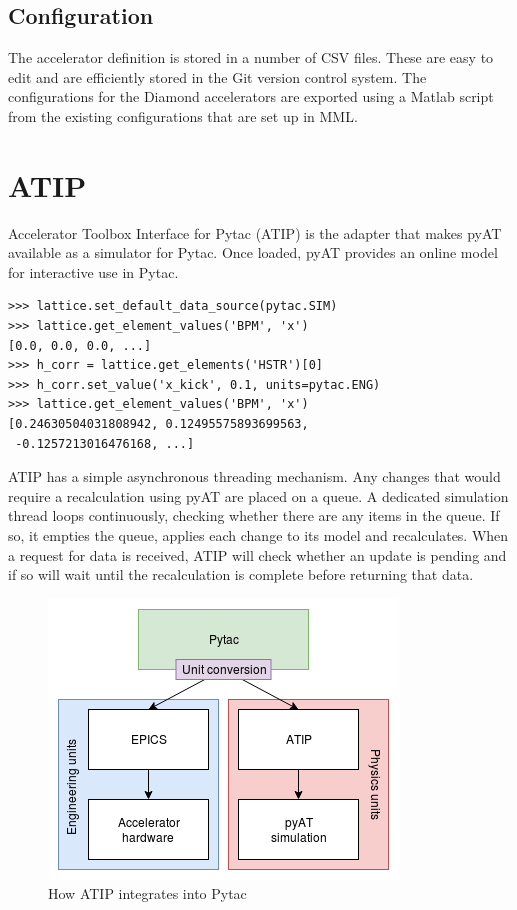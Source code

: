 \documentclass[a4paper,
               keeplastbox,   %
               ]{jacow}
\begin{document}
\subsection{Configuration}

The accelerator definition is stored in a number of CSV files. These are easy
to edit and are efficiently stored in the Git version control system. The
configurations for the Diamond accelerators are exported using a Matlab script
from the existing configurations that are set up in MML.

\section{ATIP}

Accelerator Toolbox Interface for Pytac (ATIP) is the adapter that makes pyAT
available as a simulator for Pytac. Once loaded, pyAT provides an online model
for interactive use in Pytac.

\begin{lstlisting}
>>> lattice.set_default_data_source(pytac.SIM)
>>> lattice.get_element_values('BPM', 'x')
[0.0, 0.0, 0.0, ...]
>>> h_corr = lattice.get_elements('HSTR')[0]
>>> h_corr.set_value('x_kick', 0.1, units=pytac.ENG)
>>> lattice.get_element_values('BPM', 'x')
[0.24630504031808942, 0.12495575893699563, 
 -0.1257213016476168, ...]
\end{lstlisting}

ATIP has a simple asynchronous threading mechanism. Any changes that would require a
recalculation using pyAT are placed on a queue. A dedicated simulation thread loops
continuously, checking whether there are any items in the queue. If so, it empties the
queue, applies each change to its model and recalculates. When a request for data is
received, ATIP will check whether an update is pending and if so will wait until 
the recalculation is complete before returning that data.

\begin{figure}[!hbt]
    \centering
    \includegraphics*[width=\columnwidth]{MOPHA017f1}

    \caption{How ATIP integrates into Pytac}
    \label{fig:atip}
\end{figure}
\end{document}
